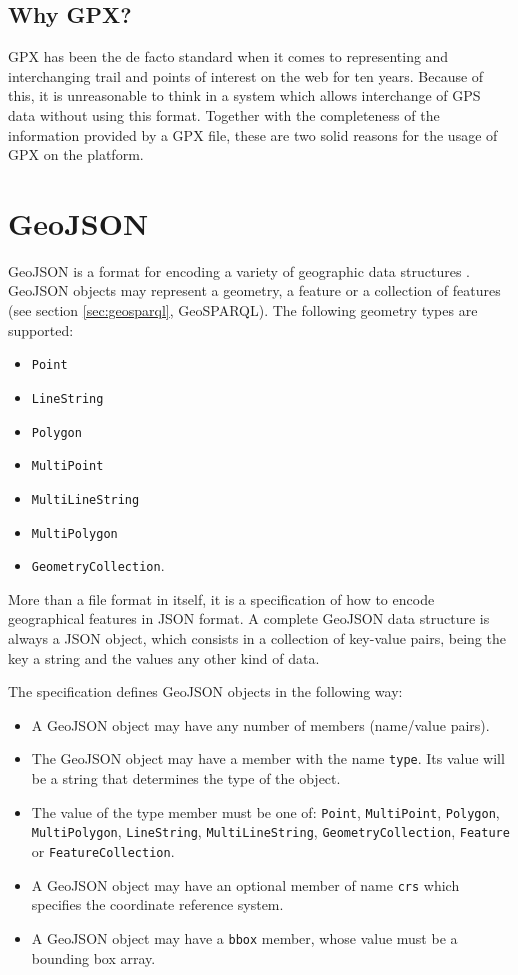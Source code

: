 \subsection*{Why GPX?}

GPX has been the de facto standard when it comes to representing and interchanging trail and points of interest on the web for ten years. Because of this, it is unreasonable to think in a system which allows interchange of GPS data without using this format. Together with the completeness of the information provided by a GPX file, these are two solid reasons for the usage of GPX on the platform.

\section{GeoJSON}\label{sec:geojson}

GeoJSON is a format for encoding a variety of geographic data structures \cite{geojson}. GeoJSON objects may represent a geometry, a feature or a collection of features (see section \ref{sec:geosparql}, GeoSPARQL). The following geometry types are supported: 
\begin{itemize}
\item \texttt{Point}
\item \texttt{LineString}
\item \texttt{Polygon}
\item \texttt{MultiPoint}
\item \texttt{MultiLineString}
\item \texttt{MultiPolygon} 
\item \texttt{GeometryCollection}.
\end{itemize}

More than a file format in itself, it is a specification of how to encode geographical features in JSON format. A complete GeoJSON data structure is always a JSON object, which consists in a collection of key-value pairs, being the key a string and the values any other kind of data.

The specification defines GeoJSON objects in the following way:

\begin{itemize}
\item A GeoJSON object may have any number of members (name/value pairs).
\item The GeoJSON object may have a member with the name \texttt{type}. Its value will be a string that determines the type of the object.
\item The value of the type member must be one of: \texttt{Point}, \texttt{MultiPoint}, \texttt{Polygon}, \texttt{MultiPolygon}, \texttt{LineString}, \texttt{MultiLineString}, \texttt{GeometryCollection}, \texttt{Feature} or \texttt{FeatureCollection}.
\item A GeoJSON object may have an optional member of name \texttt{crs} which specifies the coordinate reference system.
\item A GeoJSON object may have a \texttt{bbox} member, whose value must be a bounding box array.
\end{itemize}

